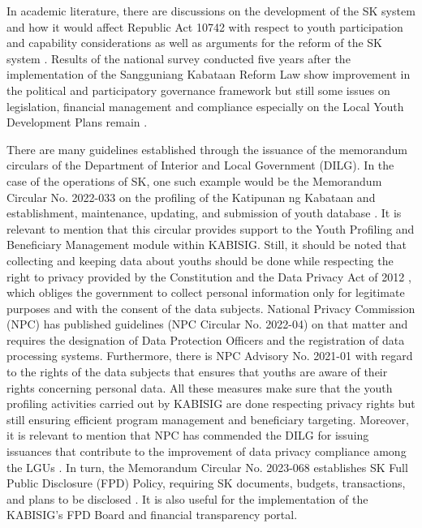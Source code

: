 \hspace*{\parindent}In academic literature, there are discussions on the development of the SK system and how it would affect Republic Act 10742 with respect to youth participation and capability considerations as well as arguments for the reform of the SK system \cite{S}. Results of the national survey conducted five years after the implementation of the Sangguniang Kabataan Reform Law show improvement in the political and participatory governance framework but still some issues on legislation, financial management and compliance especially on the Local Youth Development Plans remain \cite{T}.
\vspace{5mm}

\hspace*{\parindent}There are many guidelines established through the issuance of the memorandum circulars of the Department of Interior and Local Government (DILG). In the case of the operations of SK, one such example would be the Memorandum Circular No. 2022-033 on the profiling of the Katipunan ng Kabataan and establishment, maintenance, updating, and submission of youth database \cite{L}. It is relevant to mention that this circular provides support to the Youth Profiling and Beneficiary Management module within KABISIG. Still, it should be noted that collecting and keeping data about youths should be done while respecting the right to privacy provided by the Constitution and the Data Privacy Act of 2012 \cite{AT}, which obliges the government to collect personal information only for legitimate purposes and with the consent of the data subjects. National Privacy Commission (NPC) has published guidelines (NPC Circular No. 2022-04) \cite{AH} on that matter and requires the designation of Data Protection Officers and the registration of data processing systems. Furthermore, there is NPC Advisory No. 2021-01 \cite{AG} with regard to the rights of the data subjects that ensures that youths are aware of their rights concerning personal data. All these measures make sure that the youth profiling activities carried out by KABISIG are done respecting privacy rights but still ensuring efficient program management and beneficiary targeting. Moreover, it is relevant to mention that NPC has commended the DILG for issuing issuances that contribute to the improvement of data privacy compliance among the LGUs \cite{AJ}. In turn, the Memorandum Circular No. 2023-068 establishes SK Full Public Disclosure (FPD) Policy, requiring SK documents, budgets, transactions, and plans to be disclosed \cite{M}. It is also useful for the implementation of the KABISIG's FPD Board and financial transparency portal.
\vspace{5mm}

